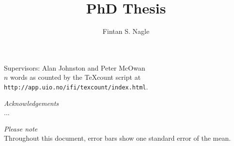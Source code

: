 \documentclass[a4paper]{report}
\title{PhD Thesis}
\author{Fintan S. Nagle}
\begin{document}
\maketitle

\begin{center}
Supervisors: Alan Johnston and Peter McOwan
\\
$n$ words as counted by  the TeXcount script at \texttt{http://app.uio.no/ifi/texcount/index.html}.
\vspace{3cm}


\vspace{3cm}

\textit{Acknowledgements}\\
...

\vspace{3cm}

\textit{Please note}\\
Throughout this document, error bars show one standard error of the mean.
\end{center}


\pagebreak


\tableofcontents

\pagebreak













\begin{singlespace}
\begin{footnotesize}
\begin{twocolumn}


\end{twocolumn}
\end{footnotesize}
\end{singlespace}
\newpage


\end{document}

